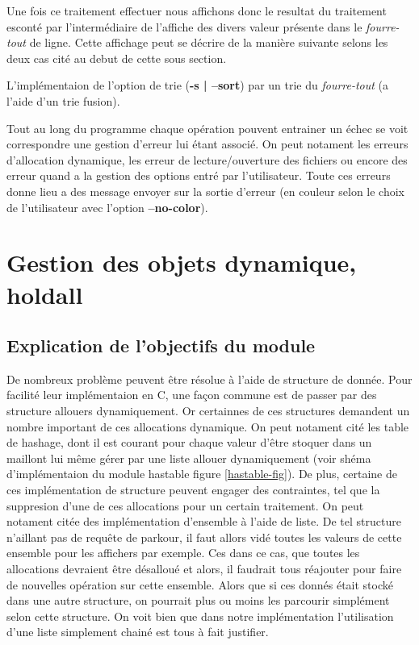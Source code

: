 \documentclass[12pt]{article}
\begin{document}
    Une fois ce traitement effectuer nous affichons donc le resultat du 
    traitement esconté par l'intermédiaire de l'affiche des divers valeur 
    présente dans le \textit{fourre-tout} de ligne. Cette affichage peut se 
    décrire de la manière suivante selons les deux cas cité au debut de cette 
    sous section.


    L'implémentaion de l'option de trie (\textbf{-s | --sort}) par un trie du 
    \textit{fourre-tout} (a l'aide d'un trie fusion).

    Tout au long du programme chaque opération pouvent entrainer un échec se 
    voit correspondre une gestion d'erreur lui étant associé. On peut notament 
    les erreurs d'allocation dynamique, les erreur de lecture/ouverture des 
    fichiers ou encore des erreur quand a la gestion des options entré par 
    l'utilisateur. Toute ces erreurs donne lieu a des message envoyer sur la 
    sortie d'erreur (en couleur selon le choix de l'utilisateur avec l'option 
    \textbf{--no-color}).

    \newpage

    \section{Gestion des objets dynamique, holdall}\label{holdall}

    \subsection{Explication de l'objectifs du module}
    
    De nombreux problème peuvent être résolue à l'aide de structure de donnée. 
    Pour facilité leur implémentaion en C, une façon commune est de passer par 
    des structure allouers dynamiquement. Or certainnes de ces structures 
    demandent un nombre important de ces allocations dynamique. On peut notament
    cité les table de hashage, dont il est courant pour chaque valeur d'être 
    stoquer dans un maillont lui même gérer par une liste allouer dynamiquement 
    (voir shéma d'implémentaion du module hastable figure \ref{hastable-fig}). 
    De plus, certaine de ces implémentation de structure peuvent engager des 
    contraintes, tel que la suppresion d'une de ces allocations pour un certain
    traitement. On peut notament citée des implémentation d'ensemble à l'aide de 
    liste. De tel structure n'aillant pas de requête de parkour, il faut allors 
    vidé toutes les valeurs de cette ensemble pour les affichers par exemple. 
    Ces dans ce cas, que toutes les allocations devraient être désalloué et 
    alors, il  faudrait tous réajouter pour faire de nouvelles opération sur 
    cette ensemble. Alors que si ces donnés était stocké dans une autre 
    structure, on pourrait plus ou moins les parcourir simplément selon cette 
    structure. On voit bien que dans notre implémentation l'utilisation d'une 
    liste simplement chainé est tous à fait justifier.
\end{document}
